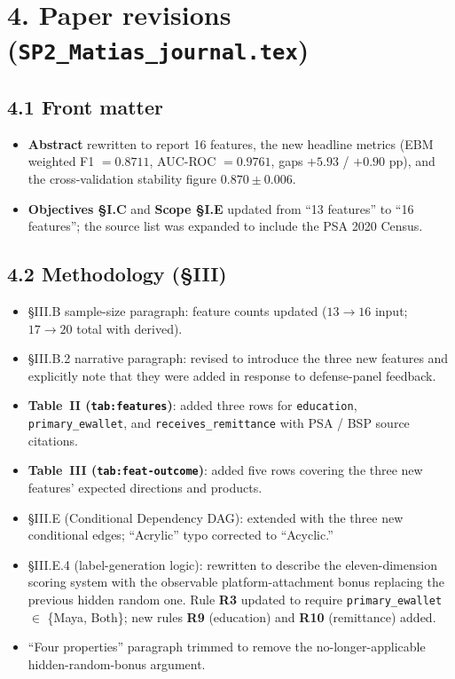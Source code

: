 \documentclass[11pt,a4paper]{article}
\begin{document}
\section*{4. Paper revisions (\texttt{SP2\_Matias\_journal.tex})}

\subsection*{4.1 Front matter}

\begin{itemize}
    \item \textbf{Abstract} rewritten to report 16 features, the new
    headline metrics (EBM weighted F1 $=0.8711$, AUC-ROC $=0.9761$,
    gaps $+5.93$ / $+0.90$ pp), and the cross-validation stability
    figure $0.870 \pm 0.006$.
    \item \textbf{Objectives \S I.C} and \textbf{Scope \S I.E} updated
    from ``13 features'' to ``16 features''; the source list was
    expanded to include the PSA 2020 Census.
\end{itemize}

\subsection*{4.2 Methodology (\S III)}

\begin{itemize}
    \item \S III.B sample-size paragraph: feature counts updated
    ($13 \to 16$ input; $17 \to 20$ total with derived).
    \item \S III.B.2 narrative paragraph: revised to introduce the
    three new features and explicitly note that they were added in
    response to defense-panel feedback.
    \item \textbf{Table~II (\texttt{tab:features})}: added three rows
    for \texttt{education}, \texttt{primary\_ewallet}, and
    \texttt{receives\_remittance} with PSA / BSP source citations.
    \item \textbf{Table~III (\texttt{tab:feat-outcome})}: added five
    rows covering the three new features' expected directions and
    products.
    \item \S III.E (Conditional Dependency DAG): extended with the
    three new conditional edges; ``Acrylic'' typo corrected to
    ``Acyclic.''
    \item \S III.E.4 (label-generation logic): rewritten to describe
    the eleven-dimension scoring system with the observable
    platform-attachment bonus replacing the previous hidden random
    one. Rule \textbf{R3} updated to require
    \texttt{primary\_ewallet} $\in$ \{Maya, Both\}; new rules \textbf{R9}
    (education) and \textbf{R10} (remittance) added.
    \item ``Four properties'' paragraph trimmed to remove the
    no-longer-applicable hidden-random-bonus argument.
\end{itemize}
\end{document}
